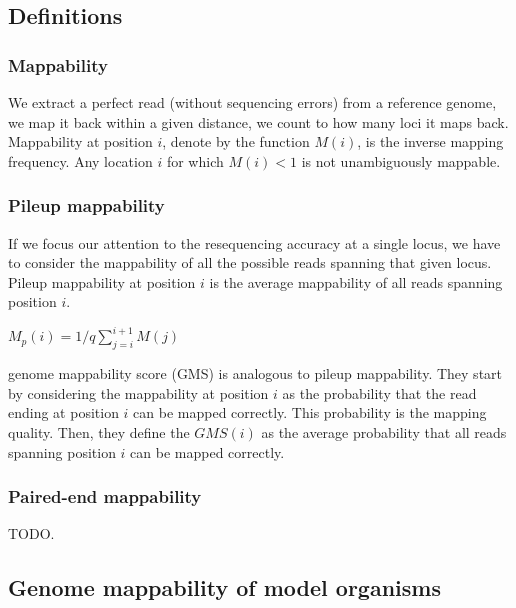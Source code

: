 
\subsection{Definitions}

\subsubsection{Mappability}

We extract a perfect read (without sequencing errors) from a reference genome, we map it back within a given distance, we count to how many loci it maps back.
Mappability at position $i$, denote by the function $M(i)$, is the inverse mapping frequency.
Any location $i$ for which $M(i) < 1$ is not unambiguously mappable.

\subsubsection{Pileup mappability}

If we focus our attention to the resequencing accuracy at a single locus, we have to consider the mappability of all the possible reads spanning that given locus.
Pileup mappability \citep{Derrien2012} at position $i$ is the average mappability of all reads spanning position $i$.

$M_p(i) = 1/q \sum_{j=i}^{i+1}{M(j)}$

\citep{Lee2012} genome mappability score (GMS) is analogous to pileup mappability.
They start by considering the mappability at position $i$ as the probability that the read ending at position $i$ can be mapped correctly.
This probability is the mapping quality.
Then, they define the $GMS(i)$ as the average probability that all reads spanning position $i$ can be mapped correctly.

\begin{center}

\end{center}

\subsubsection{Paired-end mappability}

TODO.


\subsection{Genome mappability of model organisms}

